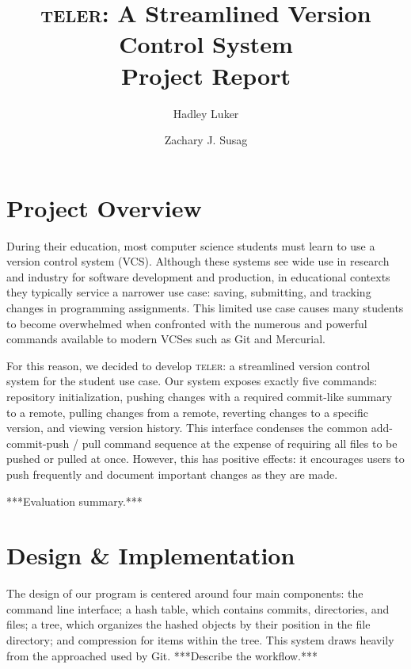 \documentclass[12pt, letterpaper]{article}
\begin{document}
\title{
  \textsc{teler}: A Streamlined Version Control System\\
  \large Project Report
}

\author{
  Hadley Luker \and Zachary J. Susag
}

\maketitle

\section{Project Overview}
\label{sec:overview}

During their education, most computer science students must learn to use a
version control system (VCS). Although these systems see wide use in research
and industry for software development and production, in educational contexts
they typically service a narrower use case: saving, submitting, and tracking
changes in programming assignments. This limited use case causes many students
to become overwhelmed when confronted with the numerous and powerful commands
available to modern VCSes such as Git and Mercurial.

For this reason, we decided to develop \textsc{teler}: a streamlined version
control system for the student use case. Our system exposes exactly five
commands: repository initialization, pushing changes with a required commit-like
summary to a remote, pulling changes from a remote, reverting changes to a
specific version, and viewing version history. This interface condenses the
common add-commit-push / pull command sequence at the expense of requiring all
files to be pushed or pulled at once. However, this has positive effects:
it encourages users to push frequently and document important changes as they
are made.

***Evaluation summary.***

\section{Design \& Implementation}
\label{sec:design}
The design of our program is centered around four main components: the command
line interface; a hash table, which contains commits, directories, and files; a
tree, which organizes the hashed objects by their position in the file
directory; and compression for items within the tree. This system draws heavily
from the approached used by Git. ***Describe the workflow.***
\end{document}
